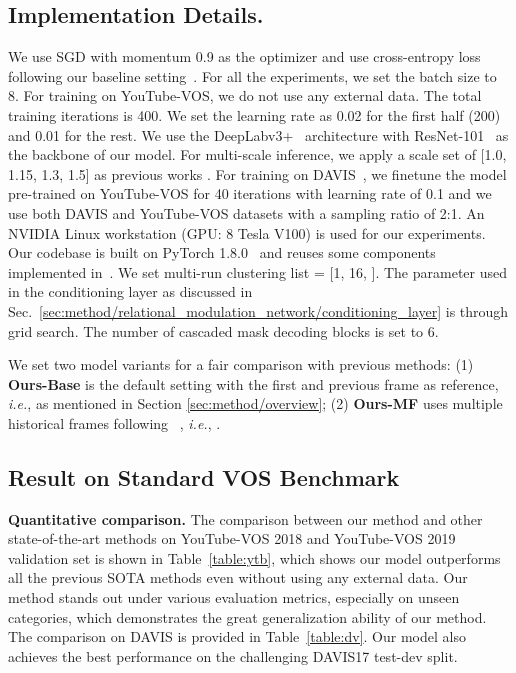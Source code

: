 \documentclass[sigconf]{acmart}
\begin{document}
\subsection{Implementation Details.}
We use SGD \cite{bottou2010large} with momentum 0.9 as the optimizer and use cross-entropy loss following our baseline setting~\cite{yang2020collaborative}.
For all the experiments, we set the batch size to 8.
For training on YouTube-VOS, we do not use any external data.
The total training iterations is 400. We set
the learning rate as 0.02 for the first half (200) and 0.01 for the rest.
We use the DeepLabv3+~\cite{chen2018encoder} architecture with ResNet-101~\cite{he2016deep} as the backbone of our model. For multi-scale inference, 
we apply a scale set of [1.0, 1.15, 1.3, 1.5] as previous works \cite{yang2021collaborative,yang2020collaborative}.
For training on DAVIS~\cite{perazzi2016benchmark}, 
    we finetune the model pre-trained on YouTube-VOS for 40 iterations with learning rate of 0.1 and we use both DAVIS and YouTube-VOS datasets with a sampling ratio of 2:1. An NVIDIA Linux workstation (GPU: 8 Tesla V100) is used for our experiments. Our codebase is built on PyTorch 1.8.0~\cite{paszke2019pytorch} and 
    reuses some components implemented in~\cite{yang2020collaborative}. 
We set multi-run clustering list  = [1, 16, ]. The parameter  used in the conditioning layer as discussed in 
    Sec.~\ref{sec:method/relational_modulation_network/conditioning_layer} is  through grid search. The number of cascaded mask decoding blocks  is set to 6. 

 We set two model variants for a fair comparison with previous methods: (1) \textbf{Ours-Base} is the default setting with the first and previous frame as reference, \textit{i.e.},  as mentioned in Section \ref{sec:method/overview}; (2) \textbf{Ours-MF} uses multiple historical frames following ~\cite{oh2019video,yang2021associating}, \textit{i.e.}, .

\subsection{Result on Standard VOS Benchmark}
\textbf{Quantitative comparison.}
The comparison between our method and other state-of-the-art methods
    on YouTube-VOS 2018 and YouTube-VOS 2019 validation set
        is shown in Table~\ref{table:ytb}, which shows
    our model outperforms all the previous SOTA methods even without using any external data.
Our method stands out under various evaluation metrics, especially on unseen categories, 
    which demonstrates the great generalization ability of our method. The comparison on DAVIS is provided in Table~\ref{table:dv}. Our model also achieves the best performance on the challenging DAVIS17 test-dev split.
    
\end{document}
